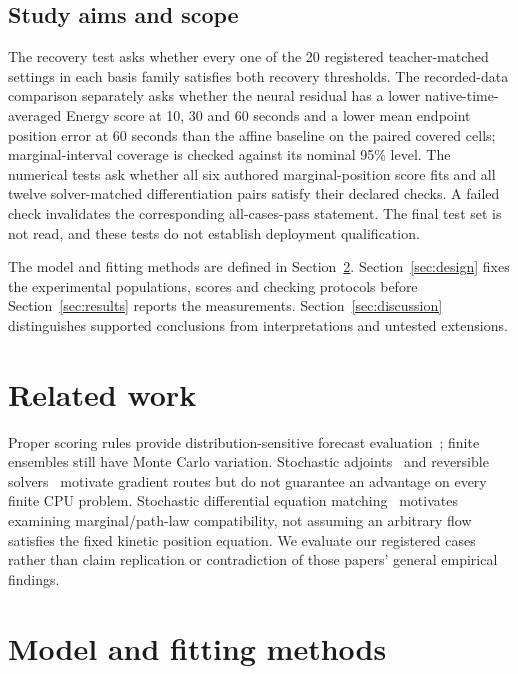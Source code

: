 \documentclass[11pt]{article}
\begin{document}
\subsection{Study aims and scope}\label{sec:questions}
The recovery test asks whether every one of the 20 registered teacher-matched settings in each basis family satisfies both recovery thresholds. The recorded-data comparison separately asks whether the neural residual has a lower native-time-averaged Energy score at 10, 30 and 60 seconds and a lower mean endpoint position error at 60 seconds than the affine baseline on the paired covered cells; marginal-interval coverage is checked against its nominal 95\% level. The numerical tests ask whether all six authored marginal-position score fits and all twelve solver-matched differentiation pairs satisfy their declared checks. A failed check invalidates the corresponding all-cases-pass statement. The final test set is not read, and these tests do not establish deployment qualification.

The model and fitting methods are defined in Section~\ref{sec:model}. Section~\ref{sec:design} fixes the experimental populations, scores and checking protocols before Section~\ref{sec:results} reports the measurements. Section~\ref{sec:discussion} distinguishes supported conclusions from interpretations and untested extensions.

\section{Related work}\label{sec:related}
Proper scoring rules provide distribution-sensitive forecast evaluation~\cite{gneiting2007}; finite ensembles still have Monte Carlo variation. Stochastic adjoints~\cite{li2020} and reversible solvers~\cite{kidger2021} motivate gradient routes but do not guarantee an advantage on every finite CPU problem. Stochastic differential equation matching~\cite{bartosh2025} motivates examining marginal/path-law compatibility, not assuming an arbitrary flow satisfies the fixed kinetic position equation. We evaluate our registered cases rather than claim replication or contradiction of those papers' general empirical findings.

\section{Model and fitting methods}\label{sec:model}
\end{document}
